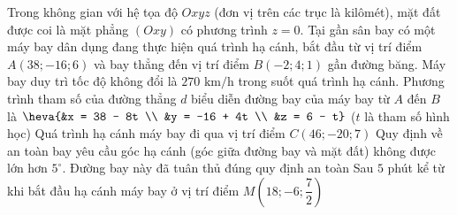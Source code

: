 \begin{ex}%
	Trong không gian với hệ tọa độ $Oxyz$ (đơn vị trên các trục là kilômét), mặt đất được coi là mặt phẳng $(Oxy)$ có phương trình $z=0$. Tại gần sân bay có một máy bay dân dụng đang thực hiện quá trình hạ cánh, bắt đầu từ vị trí điểm $A(38; -16; 6)$ và bay thẳng đến vị trí điểm $B(-2; 4; 1)$ gần đường băng. Máy bay duy trì tốc độ không đổi là $270 \text{ km/h}$ trong suốt quá trình hạ cánh. 
	 \choiceTF
		{\True Phương trình tham số của đường thẳng $d$ biểu diễn đường bay của máy bay từ $A$ đến $B$ là $\heva{&x = 38 - 8t \\ &y = -16 + 4t \\ &z = 6 - t}$ ($t$ là tham số hình  học)}
		{Quá trình hạ cánh máy bay đi qua vị trí điểm $C(46; -20; 7)$} 
		{Quy định về an toàn bay yêu cầu góc hạ cánh (góc giữa đường bay và mặt đất) không được lớn hơn $5^\circ$. Đường bay này đã tuân thủ đúng quy  định an toàn}
		{\True Sau $5$ phút kể từ khi bắt đầu hạ cánh máy bay ở vị trí điểm $M\left(18; -6;  \dfrac{7}{2}\right)$}
\end{ex}
